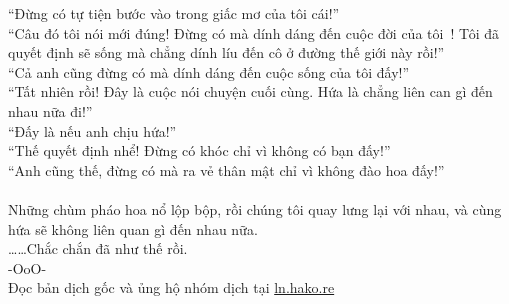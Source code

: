\documentclass[12pt,a4paper, twosides]{book}
\begin{document}
“Đừng có tự tiện bước vào trong giấc mơ của tôi cái!”\\
“Câu đó tôi nói mới đúng! Đừng có mà dính dáng đến cuộc đời của tôi~! Tôi đã quyết định sẽ sống mà chẳng dính líu đến cô ở đường thế giới này rồi!”\\
“Cả anh cũng đừng có mà dính dáng đến cuộc sống của tôi đấy!”\\
“Tất nhiên rồi! Đây là cuộc nói chuyện cuối cùng. Hứa là chẳng liên can gì đến nhau nữa đi!”\\
“Đấy là nếu anh chịu hứa!”\\
“Thế quyết định nhể! Đừng có khóc chỉ vì không có bạn đấy!”\\
“Anh cũng thế, đừng có mà ra vẻ thân mật chỉ vì không đào hoa đấy!”\\
\\
Những chùm pháo hoa nổ lộp bộp, rồi chúng tôi quay lưng lại với nhau, và cùng hứa sẽ không liên quan gì đến nhau nữa.\\
……Chắc chắn đã như thế rồi.\\
-OoO-\\
Đọc bản dịch gốc và ủng hộ nhóm dịch tại \href{https://ln.hako.re/}{ln.hako.re}\\
\newpage
\end{document}
